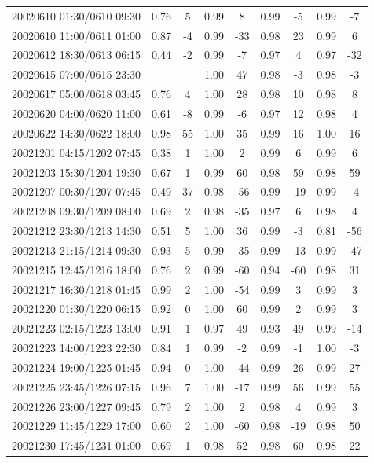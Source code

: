 \documentclass[linenumbers,draft]{agujournal}
\begin{document}
\begin{center}
\begin{longtable}{c||cc|cc|cc|cc}
20020610 01:30/0610 09:30 & 0.76 & 5 & 0.99 & 8 & 0.99 & -5 & 0.99 & -7 \\
20020610 11:00/0611 01:00 & 0.87 & -4 & 0.99 & -33 & 0.98 & 23 & 0.99 & 6 \\
20020612 18:30/0613 06:15 & 0.44 & -2 & 0.99 & -7 & 0.97 & 4 & 0.97 & -32 \\
20020615 07:00/0615 23:30 & & & 1.00 & 47 & 0.98 & -3 & 0.98 & -3 \\
20020617 05:00/0618 03:45 & 0.76 & 4 & 1.00 & 28 & 0.98 & 10 & 0.98 & 8 \\
20020620 04:00/0620 11:00 & 0.61 & -8 & 0.99 & -6 & 0.97 & 12 & 0.98 & 4 \\
20020622 14:30/0622 18:00 & 0.98 & 55 & 1.00 & 35 & 0.99 & 16 & 1.00 & 16 \\
20021201 04:15/1202 07:45 & 0.38 & 1 & 1.00 & 2 & 0.99 & 6 & 0.99 & 6 \\
20021203 15:30/1204 19:30 & 0.67 & 1 & 0.99 & 60 & 0.98 & 59 & 0.98 & 59 \\
20021207 00:30/1207 07:45 & 0.49 & 37 & 0.98 & -56 & 0.99 & -19 & 0.99 & -4 \\
20021208 09:30/1209 08:00 & 0.69 & 2 & 0.98 & -35 & 0.97 & 6 & 0.98 & 4 \\
20021212 23:30/1213 14:30 & 0.51 & 5 & 1.00 & 36 & 0.99 & -3 & 0.81 & -56 \\
20021213 21:15/1214 09:30 & 0.93 & 5 & 0.99 & -35 & 0.99 & -13 & 0.99 & -47 \\
20021215 12:45/1216 18:00 & 0.76 & 2 & 0.99 & -60 & 0.94 & -60 & 0.98 & 31 \\
20021217 16:30/1218 01:45 & 0.99 & 2 & 1.00 & -54 & 0.99 & 3 & 0.99 & 3 \\
20021220 01:30/1220 06:15 & 0.92 & 0 & 1.00 & 60 & 0.99 & 2 & 0.99 & 3 \\
20021223 02:15/1223 13:00 & 0.91 & 1 & 0.97 & 49 & 0.93 & 49 & 0.99 & -14 \\
20021223 14:00/1223 22:30 & 0.84 & 1 & 0.99 & -2 & 0.99 & -1 & 1.00 & -3 \\
20021224 19:00/1225 01:45 & 0.94 & 0 & 1.00 & -44 & 0.99 & 26 & 0.99 & 27 \\
20021225 23:45/1226 07:15 & 0.96 & 7 & 1.00 & -17 & 0.99 & 56 & 0.99 & 55 \\
20021226 23:00/1227 09:45 & 0.79 & 2 & 1.00 & 2 & 0.98 & 4 & 0.99 & 3 \\
20021229 11:45/1229 17:00 & 0.60 & 2 & 1.00 & -60 & 0.98 & -19 & 0.98 & 50 \\
20021230 17:45/1231 01:00 & 0.69 & 1 & 0.98 & 52 & 0.98 & 60 & 0.98 & 22 \\

\end{longtable}
\end{center}
\end{document}
